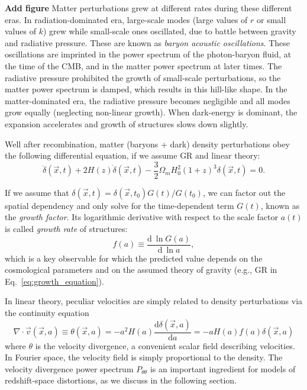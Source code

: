     \textbf{ Add figure}
    Matter perturbations grew at different rates during these different eras.
    In radiation-dominated era, large-scale modes (large values of $r$ 
    or small values of $k$) grew while small-scale ones oscillated,
    due to battle between gravity and radiative pressure. 
    These are known as \emph{baryon acoustic oscillations}. These oscillations
    are imprinted in the power spectrum of the photon-baryon fluid, at the time of the CMB, 
    and in the matter power spectrum at later times. 
    The radiative pressure prohibited the growth of small-scale perturbations,
    so the matter power spectrum is damped, which results in this hill-like shape. 
    In the matter-dominated era, the radiative pressure becomes negligible 
    and all modes grow equally (neglecting non-linear growth). 
    When dark-energy is dominant, the expansion accelerates and 
    growth of structures slows down slightly. 
    
    
    Well after recombination,
    matter (baryons + dark) density perturbations obey the following differential equation, if we 
    assume GR and linear theory:
    \begin{equation}
        \ddot\delta(\vec{x}, t) + 2H(z)\dot\delta(\vec{x}, t) - \frac{3}{2} \Omega_m H_0^2 (1+z)^3 \delta(\vec{x}, t) = 0. 
        \label{eq:growth_equation}
    \end{equation}

    If we assume that $\delta(\vec{x}, t) = \delta(\vec{x}, t_0) G(t)/G(t_0)$, we can factor out 
    the spatial dependency and only solve for the time-dependent term $G(t)$, known as the 
    \emph{growth factor}. Its logarithmic derivative with respect to the scale factor $a(t)$ 
    is called \emph{growth rate} of structures:
    \begin{equation}
        f(a) \equiv \frac{ \mathrm{d}~ \ln G(a)}{\mathrm{d}~ \ln a},
        \label{eq:growth_rate}
    \end{equation}
    which is a key observable for which the predicted value 
    depends on the cosmological parameters and on the assumed
    theory of gravity (e.g., GR in Eq.~\ref{eq:growth_equation}). 

    In linear theory, peculiar velocities are simply related to 
    density perturbations via the continuity equation 
    \begin{equation}
        \nabla \cdot \vec{v}(\vec{x}, a) 
            \equiv \theta(\vec{x}, a) 
            = -a^2 H(a) \frac{\mathrm{d}\delta(\vec{x}, a)}{\mathrm{d}a} 
            = -a H(a) f(a) \delta(\vec{x}, a) 
        \label{eq:velocity_from_density}
    \end{equation}
    where $\theta$ is the velocity divergence, a convenient scalar field describing velocities. 
    In Fourier space, the velocity field is simply proportional to the density. 
    The velocity divergence power spectrum $P_{\theta \theta}$ is an important ingredient 
    for models of redshift-space distortions, as we discuss in the following section. 

